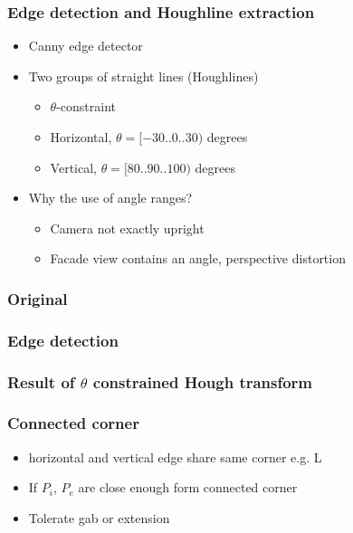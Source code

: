 \documentclass{beamer}
\begin{document}
\frame
{
	\frametitle{Edge detection and Houghline extraction}
	\begin{itemize}
	\item <+-| alert@+> Canny edge detector
	\item <+-| alert@+> Two groups of straight lines (Houghlines)
	\begin{itemize}
		\item $\theta$-constraint
		\item <+-| alert@+> Horizontal, $\theta = [-30..0..30)$ degrees
		\item <+-| alert@+> Vertical, $\theta = [80..90..100)$ degrees
	\end{itemize}
	\item <+-| alert@+> Why the use of angle ranges?
	\begin{itemize}
		\item <+-| alert@+> Camera not exactly upright
		\item <+-| alert@+> Facade view contains an angle, perspective distortion 
	\end{itemize}
	\end{itemize}

}

\frame
{
	\frametitle{Original}
}

\frame
{
	\frametitle{Edge detection}
}

\frame
{
	\frametitle{Result of $\theta$ constrained Hough transform}
}

\frame
{
	\frametitle{Connected corner}
	\begin{itemize}
	\item <+-| alert@+> horizontal and vertical edge share same corner e.g. L
	\item <+-| alert@+> If $P_i$, $P_e$ are close enough form connected corner
	\item <+-| alert@+> Tolerate gab or extension
	\end{itemize}
}
\end{document}
